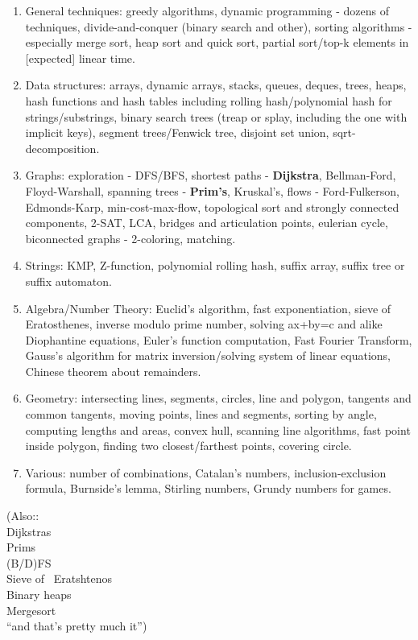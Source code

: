 \documentclass[11pt]{article}
\begin{document}
\begin{enumerate}
\item{General techniques: greedy algorithms, dynamic programming - dozens of techniques, divide-and-conquer (binary search and other), sorting algorithms - especially merge sort, heap sort and quick sort, partial sort/top-k elements in [expected] linear time.}

\item{Data structures: arrays, dynamic arrays, stacks, queues, deques, trees, heaps, hash functions and hash tables including rolling hash/polynomial hash for strings/substrings, binary search trees (treap or splay, including the one with implicit keys), segment trees/Fenwick tree, disjoint set union, sqrt-decomposition.}

\item{Graphs: exploration - DFS/BFS, shortest paths - {\bf Dijkstra}, Bellman-Ford, Floyd-Warshall, spanning trees - {\bf Prim’s}, Kruskal’s, flows - Ford-Fulkerson, Edmonds-Karp, min-cost-max-flow, topological sort and strongly connected components, 2-SAT, LCA, bridges and articulation points, eulerian cycle, biconnected graphs - 2-coloring, matching.}

\item{Strings: KMP, Z-function, polynomial rolling hash, suffix array, suffix tree or suffix automaton.}

\item{Algebra/Number Theory: Euclid’s algorithm, fast exponentiation, sieve of Eratosthenes, inverse modulo prime number, solving ax+by=c and alike Diophantine equations, Euler’s function computation, Fast Fourier Transform, Gauss’s algorithm for matrix inversion/solving system of linear equations, Chinese theorem about remainders.}

\item{Geometry: intersecting lines, segments, circles, line and polygon, tangents and common tangents, moving points, lines and segments, sorting by angle, computing lengths and areas, convex hull, scanning line algorithms, fast point inside polygon, finding two closest/farthest points, covering circle.}

\item{Various: number of combinations, Catalan’s numbers, inclusion-exclusion formula, Burnside’s lemma, Stirling numbers, Grundy numbers for games.}
\end{enumerate}

\noindent
(Also:: \\
Dijkstras\\
Prims \\
(B/D)FS \\
Sieve of ~Eratshtenos \\
Binary heaps\\
Mergesort\\
``and that's pretty much it'')
\end{document}
